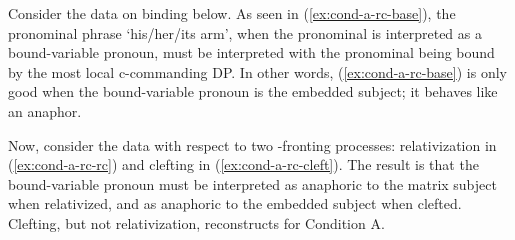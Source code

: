 \documentclass[12pt]{article}
\begin{document}

Consider the data on binding below. As seen in (\ref{ex:cond-a-rc-base}), the pronominal phrase  `his/her/its arm', when the pronominal is interpreted as a bound-variable pronoun, must be interpreted with the pronominal being bound by the most local c-commanding DP. In other words, (\ref{ex:cond-a-rc-base}) is only good when the bound-variable pronoun is the embedded subject; it behaves like an anaphor. 

\begin{samepage}
\bex
{} \label{ex:cond-a-rc-base}
\fex
\end{samepage}

Now, consider the data with respect to two \abar{}-fronting processes: relativization in (\ref{ex:cond-a-rc-rc}) and clefting in (\ref{ex:cond-a-rc-cleft}). The result is that the bound-variable pronoun must be interpreted as anaphoric to the matrix subject when relativized, and as anaphoric to the embedded subject when clefted. Clefting, but not relativization, reconstructs for Condition A.

\begin{samepage}
\bex
\ex {}\bxl
{} \label{ex:cond-a-rc-rc}
 \label{ex:cond-a-rc-cleft}
\fxl
\fex
\end{samepage}
\end{document}
